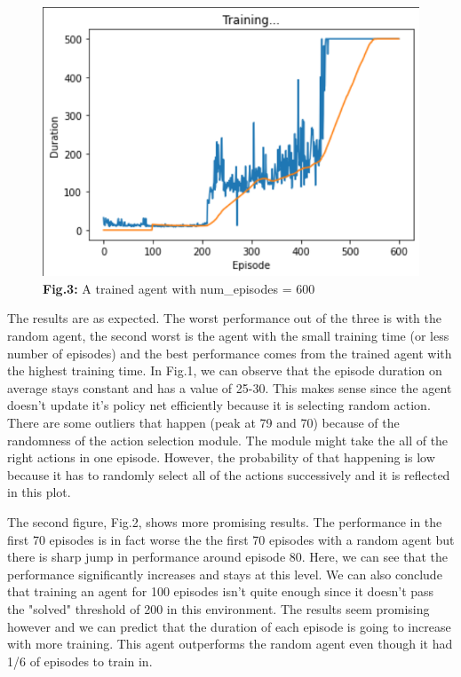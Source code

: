 \documentclass{article}
\numberwithin{equation}{section}
\numberwithin{equation}{section}
\begin{document}
\begin{figure}[H]
	\centering
	
	\includegraphics[width=\linewidth,cframe=blue 2.5pt 2.5pt]{agent600.png}
	\\	
	\vspace{0.1in}
	\textbf{Fig.3:} A trained agent with num\_episodes = 600
	\\
	\label{fig:Fig.3}
\end{figure}


The results are as expected. The worst performance out of the three is with the random agent, the second worst is the agent with the small training time (or less number of episodes) and the best performance comes from the trained agent with the highest training time. In Fig.1, we can observe that the episode duration on average stays constant and has a value of 25-30. This makes sense since the agent doesn't update it's policy net efficiently because it is selecting random action. There are some outliers that happen (peak at 79 and 70) because of the randomness of the action selection module. The module might take the all of the right actions in one episode. However, the probability of that happening is low because it has to randomly select all of the actions successively and it is reflected in this plot. 

The second figure, Fig.2, shows more promising results. The performance in the first 70 episodes is in fact worse the the first 70 episodes with a random agent but there is sharp jump in performance around episode 80. Here, we can see that the performance significantly increases and stays at this level. We can also conclude that training an agent for 100 episodes isn't quite enough since it doesn't pass the "solved" threshold of 200 in this environment. The results seem promising however and we can predict that the duration of each episode is going to increase with more training. This agent outperforms the random agent even though it had 1/6 of episodes to train in.
\end{document}
